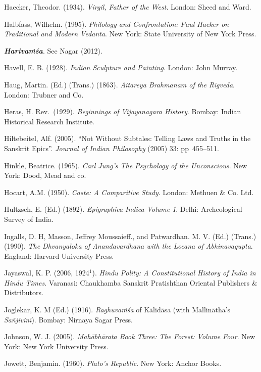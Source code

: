 \begin{thebibliography}{99}
Haecker, Theodor. (1934). {\sl Virgil, Father of the West}. London: Sheed and Ward. 

Halbfass, Wilhelm. (1995). {\sl Philology and Confrontation: Paul Hacker on Traditional and Modern Vedanta}. New York: State University of New York Press. 

{\sl\bfseries Harivaṁśa}. See Nagar (2012). 

Havell, E. B. (1928). {\sl Indian Sculpture and Painting}. London: John Murray. 

Haug, Martin. (Ed.) (Trans.) (1863). {\sl Aitareya Brahmanam of the Rigveda}. London: Trubner and Co. 

Heras, H. Rev.\ (1929). {\sl Beginnings of Vijayanagara History}. Bombay: Indian Historical Research Institute. 

Hiltebeitel, Alf. (2005). “Not Without Subtales: Telling Laws and Truths in the Sanskrit Epics”. {\sl Journal 
of Indian Philosophy} (2005) 33: pp~455--511.

Hinkle, Beatrice. (1965). {\sl Carl Jung’s The Psychology of the Unconscious}. New York: Dood, Mead and co. 

Hocart, A.M. (1950). {\sl Caste: A Comparitive Study}. London: Methuen \& Co. Ltd. 

Hultzsch, E. (Ed.) (1892). {\sl Epigraphica Indica Volume 1}. Delhi: Archeological Survey of India. 

Ingalls, D. H,  Masson, Jeffrey Moussaieff., and Patwardhan. M. V. (Ed.) (Trans.) (1990). {\sl The Dhvanyaloka of 
Anandavardhana with the Locana of Abhinavagupta}. England: Harvard University Press. 

Jayaswal, K. P. (2006, 1924$^{1}$). {\sl Hindu Polity: A Constitutional History of India in Hindu Times}. Varanasi: Chaukhamba Sanskrit Pratishthan Oriental Publishers \& Distributors. 

Joglekar, K. M (Ed.) (1916). {\sl Raghuvaṁśa} of Kālidāsa (with Mallinātha’s {\sl Sañjīvinī}). Bombay: Nirnaya Sagar Press.  

Johnson, W. J. (2005). {\sl Mahābhārata Book Three: The Forest: Volume Four}. New York: New York University Press. 

Jowett, Benjamin. (1960). {\sl Plato’s Republic}. New York: Anchor Books. 


\end{thebibliography}
